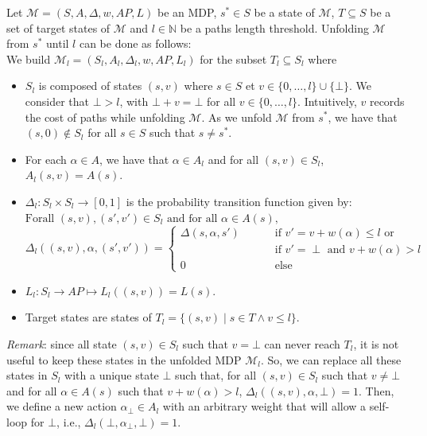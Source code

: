 \begin{definition} Let
  $\mathcal{M} = (S, A, \Delta, w, AP, L)$ be an MDP, $s^* \in S$ be a state of
  $\mathcal{M}$, $T \subseteq S$ be a set of target states of $\mathcal{M}$ and $l \in \mathbb{N}$ be a paths length threshold.
  Unfolding $\mathcal{M}$ from $s^*$ until $l$ can be done as follows: \\
  We build $\mathcal{M}_l = (S_l, A_l, \Delta_l, w, AP, L_l)$ for the subset $T_l \subseteq S_l$ where
  \begin{itemize}
  \item $S_l$ is composed of states $(s, v)$ where $s \in S$ et $v \in \{0, \dots, l\} \cup \{\bot\}$.
  We consider that $\bot > l$, with $\bot + v = \bot$ for all $v \in \{0, \dots, l\}$.
  Intuitively, $v$ records the cost of paths while unfolding $\mathcal{M}$.
  As we unfold $\mathcal{M}$ from $s^*$, we have that
  $(s, 0) \not \in S_l$ for all $s \in S$ such that $s \neq s^*$.
  \item For each $\alpha \in A$, we have that $\alpha \in A_l$ and for all $(s, v) \in S_l$, $A_l(s, v) = A(s)$.
  \item $\Delta_l: S_l \times S_l \rightarrow [0, 1]$ is the probability transition function given by:\\
  $\text{Forall } (s, v), (s', v') \in S_l \text{ and for all } \alpha \in A(s),$
  \[
  \Delta_l((s, v), \alpha, (s', v')) =
  \begin{cases}
  	\Delta(s, \alpha, s') & \quad \quad \text{ if } v' = v + w(\alpha) \leq l \text{ or}\\
  	 & \quad \quad \text{ if } v' = \perp \text{ and } v+w(\alpha) > l \\
  	0 & \quad \quad \text{ else}
  \end{cases}
  \]
  \item $L_l:S_l \rightarrow AP \mapsto L_l((s, v)) = L(s)$.
  \item Target states are states of
  $T_l = \{(s, v) \;|\; s \in T \wedge v \leq l \}$.
  \end{itemize}
  \textit{Remark}: since all state $(s, v) \in S_l$ such that $v = \bot$ can never reach $T_l$, it is not useful to keep these states in the unfolded MDP $\mathcal{M}_l$. So, we can replace all these states in $S_l$ with a unique state $\bot$ such that, for all $(s, v) \in S_l$ such that $v \neq \bot$ and for all $\alpha \in A(s)$ such that $v + w(\alpha) > l$,
  $\Delta_l((s, v), \alpha, \bot) = 1$. Then, we define a new action $\alpha_\bot \in A_l$ with an arbitrary weight that will allow a self-loop for $\bot$, i.e., $\Delta_l(\bot, \alpha_\bot, \bot)=1$.
\end{definition}

